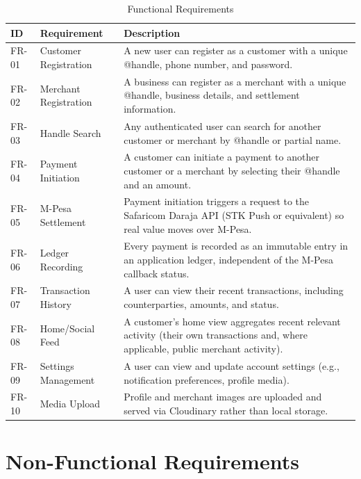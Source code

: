 \documentclass[12pt, a4paper, twoside, openright]{report}
\begin{document}
\begin{table}[H]
    \centering
    \begin{tabularx}{\textwidth}{|l|l|X|}
    \hline
    \textbf{ID} & \textbf{Requirement} & \textbf{Description} \\
    \hline
    FR-01 & Customer Registration & A new user can register as a customer with a unique @handle, phone number, and password. \\
    \hline
    FR-02 & Merchant Registration & A business can register as a merchant with a unique @handle, business details, and settlement information. \\
    \hline
    FR-03 & Handle Search & Any authenticated user can search for another customer or merchant by @handle or partial name. \\
    \hline
    FR-04 & Payment Initiation & A customer can initiate a payment to another customer or a merchant by selecting their @handle and an amount. \\
    \hline
    FR-05 & M-Pesa Settlement & Payment initiation triggers a request to the Safaricom Daraja API (STK Push or equivalent) so real value moves over M-Pesa. \\
    \hline
    FR-06 & Ledger Recording & Every payment is recorded as an immutable entry in an application ledger, independent of the M-Pesa callback status. \\
    \hline
    FR-07 & Transaction History & A user can view their recent transactions, including counterparties, amounts, and status. \\
    \hline
    FR-08 & Home/Social Feed & A customer's home view aggregates recent relevant activity (their own transactions and, where applicable, public merchant activity). \\
    \hline
    FR-09 & Settings Management & A user can view and update account settings (e.g., notification preferences, profile media). \\
    \hline
    FR-10 & Media Upload & Profile and merchant images are uploaded and served via Cloudinary rather than local storage. \\
    \hline
    \end{tabularx}
    \caption{Functional Requirements}
\end{table}

\section{Non-Functional Requirements}
\end{document}
